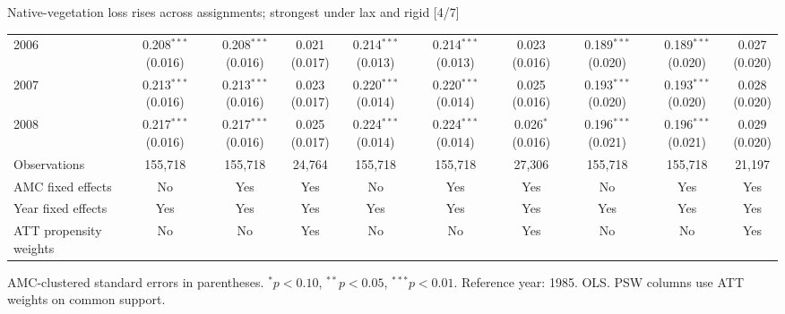 \documentclass[aspectratio=169]{beamer}
\begin{document}
\begin{frame}{Native-vegetation loss rises across assignments; strongest under lax and rigid [4/7]}
{\begin{tabular}{@{}l*{9}{c}@{}}
2006 & \shortstack{0.208$^{***}$\\(0.016)} & \shortstack{0.208$^{***}$\\(0.016)} & \shortstack{0.021\\(0.017)} & \shortstack{0.214$^{***}$\\(0.013)} & \shortstack{0.214$^{***}$\\(0.013)} & \shortstack{0.023\\(0.016)} & \shortstack{0.189$^{***}$\\(0.020)} & \shortstack{0.189$^{***}$\\(0.020)} & \shortstack{0.027\\(0.020)} \\
2007 & \shortstack{0.213$^{***}$\\(0.016)} & \shortstack{0.213$^{***}$\\(0.016)} & \shortstack{0.023\\(0.017)} & \shortstack{0.220$^{***}$\\(0.014)} & \shortstack{0.220$^{***}$\\(0.014)} & \shortstack{0.025\\(0.016)} & \shortstack{0.193$^{***}$\\(0.020)} & \shortstack{0.193$^{***}$\\(0.020)} & \shortstack{0.028\\(0.020)} \\
2008 & \shortstack{0.217$^{***}$\\(0.016)} & \shortstack{0.217$^{***}$\\(0.016)} & \shortstack{0.025\\(0.017)} & \shortstack{0.224$^{***}$\\(0.014)} & \shortstack{0.224$^{***}$\\(0.014)} & \shortstack{0.026$^{*}$\\(0.016)} & \shortstack{0.196$^{***}$\\(0.021)} & \shortstack{0.196$^{***}$\\(0.021)} & \shortstack{0.029\\(0.020)} \\
\midrule
Observations & 155,718 & 155,718 & 24,764 & 155,718 & 155,718 & 27,306 & 155,718 & 155,718 & 21,197 \\
AMC fixed effects & No & Yes & Yes & No & Yes & Yes & No & Yes & Yes \\
Year fixed effects & Yes & Yes & Yes & Yes & Yes & Yes & Yes & Yes & Yes \\
ATT propensity weights & No & No & Yes & No & No & Yes & No & No & Yes \\
\bottomrule
\end{tabular}%
}
\vspace{0.1em}
{\tiny\color{ZMidGray} AMC-clustered standard errors in parentheses. $^{*}p<0.10$, $^{**}p<0.05$, $^{***}p<0.01$. Reference year: 1985. OLS. PSW columns use ATT weights on common support.}
\end{frame}
\end{document}
